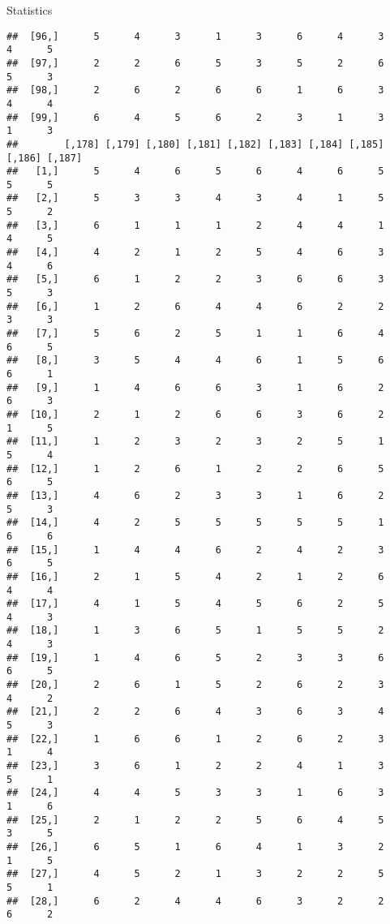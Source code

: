 \documentclass[
  ignorenonframetext,
]{beamer}
\begin{document}
\begin{frame}[fragile]{Statistics}
\begin{verbatim}
##  [96,]      5      4      3      1      3      6      4      3      4      5
##  [97,]      2      2      6      5      3      5      2      6      5      3
##  [98,]      2      6      2      6      6      1      6      3      4      4
##  [99,]      6      4      5      6      2      3      1      3      1      3
##        [,178] [,179] [,180] [,181] [,182] [,183] [,184] [,185] [,186] [,187]
##   [1,]      5      4      6      5      6      4      6      5      5      5
##   [2,]      5      3      3      4      3      4      1      5      5      2
##   [3,]      6      1      1      1      2      4      4      1      4      5
##   [4,]      4      2      1      2      5      4      6      3      4      6
##   [5,]      6      1      2      2      3      6      6      3      5      3
##   [6,]      1      2      6      4      4      6      2      2      3      3
##   [7,]      5      6      2      5      1      1      6      4      6      5
##   [8,]      3      5      4      4      6      1      5      6      6      1
##   [9,]      1      4      6      6      3      1      6      2      6      3
##  [10,]      2      1      2      6      6      3      6      2      1      5
##  [11,]      1      2      3      2      3      2      5      1      5      4
##  [12,]      1      2      6      1      2      2      6      5      6      5
##  [13,]      4      6      2      3      3      1      6      2      5      3
##  [14,]      4      2      5      5      5      5      5      1      6      6
##  [15,]      1      4      4      6      2      4      2      3      6      5
##  [16,]      2      1      5      4      2      1      2      6      4      4
##  [17,]      4      1      5      4      5      6      2      5      4      3
##  [18,]      1      3      6      5      1      5      5      2      4      3
##  [19,]      1      4      6      5      2      3      3      6      6      5
##  [20,]      2      6      1      5      2      6      2      3      4      2
##  [21,]      2      2      6      4      3      6      3      4      5      3
##  [22,]      1      6      6      1      2      6      2      3      1      4
##  [23,]      3      6      1      2      2      4      1      3      5      1
##  [24,]      4      4      5      3      3      1      6      3      1      6
##  [25,]      2      1      2      2      5      6      4      5      3      5
##  [26,]      6      5      1      6      4      1      3      2      1      5
##  [27,]      4      5      2      1      3      2      2      5      5      1
##  [28,]      6      2      4      4      6      3      2      2      6      2

\end{verbatim}
\end{frame}
\end{document}

